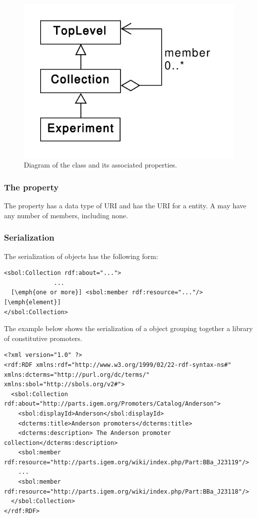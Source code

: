\begin{figure}[ht]
\begin{center}
\includegraphics[scale=0.6]{uml/collection}
\caption[]{Diagram of the  class and its associated properties.}
\label{uml:collection}
\end{center}
\end{figure}

\subsubsection*{The  property}
The  property has a data type of URI and has the URI for a  entity.  A  may have any number of members, including none.

\subsubsection*{Serialization}

The serialization of  objects has the following form:

\begin{lstlisting}
<sbol:Collection rdf:about="...">
              ...
  [\emph{one or more}] <sbol:member rdf:resource="..."/> [\emph{element}]
</sbol:Collection>
\end{lstlisting}

The example below shows the serialization of a  object grouping together a library of constitutive promoters.
\begin{lstlisting}
<?xml version="1.0" ?>
<rdf:RDF xmlns:rdf="http://www.w3.org/1999/02/22-rdf-syntax-ns#" xmlns:dcterms="http://purl.org/dc/terms/" xmlns:sbol="http://sbols.org/v2#">
  <sbol:Collection rdf:about="http://parts.igem.org/Promoters/Catalog/Anderson">
    <sbol:displayId>Anderson</sbol:displayId>
    <dcterms:title>Anderson promoters</dcterms:title>
    <dcterms:description> The Anderson promoter collection</dcterms:description>
    <sbol:member rdf:resource="http://parts.igem.org/wiki/index.php/Part:BBa_J23119"/>
    ...
    <sbol:member rdf:resource="http://parts.igem.org/wiki/index.php/Part:BBa_J23118"/>
  </sbol:Collection>
</rdf:RDF>

\end{lstlisting}
\label{ser:Collection}

